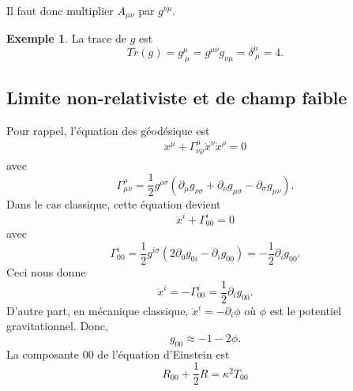 \documentclass[a4paper,11pt]{report}
\theoremstyle{definition}
\theoremstyle{plain}
\theoremstyle{definition}
\newtheorem{exmp}{Exemple}[chapter]
\theoremstyle{remark}
\newcommand{\p}{\partial}
\begin{document}
            Il faut donc multiplier $A_{\mu\nu}$ par $g^{\nu\mu}$.
            
            \begin{exmp}
                La trace de $g$ est
                \begin{equation}
                    Tr(g) = g^\mu_{~\mu} = g^{\mu\nu}g_{\nu\mu} = \delta^\mu_{~\mu} = 4.
                \end{equation}
            \end{exmp}
            
            
        \subsection{Limite non-relativiste et de champ faible}
        
            Pour rappel, l'équation des géodésique est 
            \begin{align}
                \ddot{x}^\mu + \Gamma^\mu_{\nu\rho}\dot{x}^\nu\dot{x}^\rho = 0
            \end{align}
            avec
            \begin{equation}
                \Gamma^\rho_{\mu\nu} = \frac{1}{2}g^{\rho\sigma}\left( \p_\mu g_{\nu\sigma}+\p_\nu g_{\mu\sigma}-\p_\sigma g_{\mu\nu} \right).
            \end{equation}
            Dans le cas classique, cette équation devient
            \begin{equation}
                \ddot{x}^i + \Gamma^i_{00} = 0
            \end{equation}
            avec
            \begin{equation}
                \Gamma^i_{00} = \frac{1}{2}g^{i\sigma}\left( 2\p_0 g_{0i}-\p_i g_{00} \right) = -\frac{1}{2}\p_i g_{00}.
            \end{equation}
            Ceci nous donne
            \begin{equation}
                \ddot{x}^i = -\Gamma^i_{00} = \frac{1}{2}\p_i g_{00}.
            \end{equation}
            D'autre part, en mécanique classique, $\ddot{x}^i = -\p_i\phi$ où $\phi$ est le potentiel gravitationnel. Donc,
            \begin{equation}
                g_{00}\approx -1-2\phi.
            \end{equation}
            La composante $00$ de l'équation d'Einstein est
            \begin{equation}
                R_{00}+\frac{1}{2}R = \kappa^2 T_{00}
            \end{equation}
\end{document}
